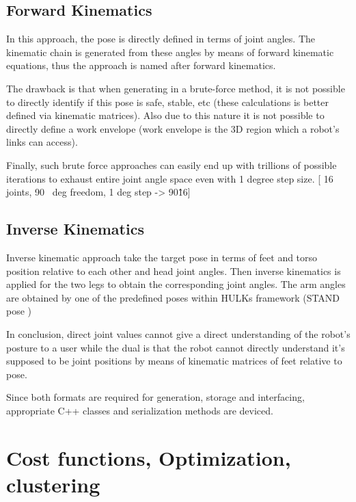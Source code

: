 \documentclass[english, printversion, nomenclature, notitle]{tuvisionthesis} %
\begin{document}
\subsection{Forward Kinematics}

In this approach, the pose is directly defined in terms of joint angles. The kinematic chain is generated from these angles by means of forward kinematic equations, thus the approach is named after forward kinematics.

The drawback is that when generating in a brute-force method, it is not possible to directly identify if this pose is safe, stable, etc (these calculations is better defined via kinematic matrices). Also due to this nature it is not possible to directly define a work envelope (work envelope is the 3D region which a robot's links can access).

Finally, such brute force approaches can easily end up with trillions  of possible iterations to exhaust entire joint angle space even with 1 degree step size. [ 16~ joints, 90~ deg freedom, 1 deg step -> 90\^16] 

\subsection{Inverse Kinematics}

Inverse kinematic approach take the target pose in terms of feet and torso position relative to each other and head joint angles. Then inverse kinematics is applied for the two legs to obtain the corresponding joint angles. The arm angles are obtained by one of the predefined poses within HULKs framework (STAND pose )

In conclusion, direct joint values cannot give a direct understanding of the robot's posture to a user while the dual is that the robot cannot directly understand it's supposed to be joint positions by means of kinematic matrices of feet relative to pose. 

Since both formats are required for generation, storage and interfacing, appropriate C++ classes and serialization methods are deviced.


\section{Cost functions, Optimization, clustering}
\end{document}
